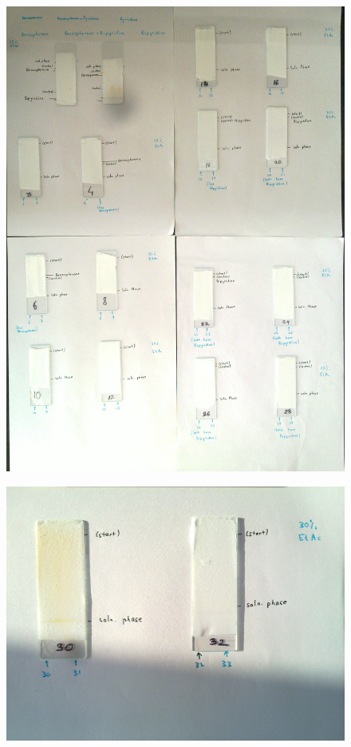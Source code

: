 	\clearpage
	\begin{figure}[bth]
		\begin{center}
			\includegraphics[width=1.5\linewidth]{gfx/e4_1}
		\end{center}
	\caption[TLCs Set 1]{\label{e4_1}}
	\end{figure}

	\begin{figure}[bth]
		\begin{center}
			\includegraphics[width=0.6\linewidth]{gfx/e4_2}
		\end{center}
	\caption[TLCs Set 2]{\label{e4_2}}
	\end{figure}


